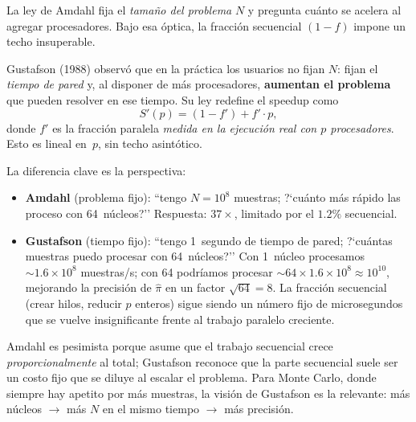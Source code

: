 \documentclass[12pt,a4paper]{article}
\begin{document}
La ley de Amdahl fija el \emph{tama\~no del problema} $N$ y pregunta cu\'anto se acelera al agregar procesadores. Bajo esa \'optica, la fracci\'on secuencial $(1-f)$ impone un techo insuperable.

Gustafson (1988) observ\'o que en la pr\'actica los usuarios no fijan $N$: fijan el \emph{tiempo de pared} y, al disponer de m\'as procesadores, \textbf{aumentan el problema} que pueden resolver en ese tiempo. Su ley redefine el speedup como
\[
S'(p) = (1-f') + f'\cdot p,
\]
donde $f'$ es la fracci\'on paralela \emph{medida en la ejecuci\'on real con $p$ procesadores}. Esto es lineal en~$p$, sin techo asint\'otico.

La diferencia clave es la perspectiva:
\begin{itemize}
  \item \textbf{Amdahl} (problema fijo): ``tengo $N=10^8$ muestras; ?`cu\'anto m\'as r\'apido las proceso con 64~n\'ucleos?'' Respuesta: $37\times$, limitado por el $1.2\%$ secuencial.
  \item \textbf{Gustafson} (tiempo fijo): ``tengo 1~segundo de tiempo de pared; ?`cu\'antas muestras puedo procesar con 64~n\'ucleos?'' Con 1~n\'ucleo procesamos ${\sim}1.6\times10^8$ muestras/s; con 64 podr\'iamos procesar ${\sim}64\times1.6\times10^8 \approx 10^{10}$, mejorando la precisi\'on de $\hat\pi$ en un factor $\sqrt{64}=8$. La fracci\'on secuencial (crear hilos, reducir $p$ enteros) sigue siendo un n\'umero fijo de microsegundos que se vuelve insignificante frente al trabajo paralelo creciente.
\end{itemize}

Amdahl es pesimista porque asume que el trabajo secuencial crece \emph{proporcionalmente} al total; Gustafson reconoce que la parte secuencial suele ser un costo fijo que se diluye al escalar el problema. Para Monte Carlo, donde siempre hay apetito por m\'as muestras, la visi\'on de Gustafson es la relevante: m\'as n\'ucleos $\to$ m\'as $N$ en el mismo tiempo $\to$ m\'as precisi\'on.
\end{document}

